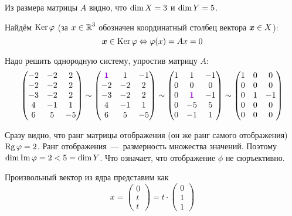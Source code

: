 \documentclass[a4paper,12pt]{article}
\DeclareMathOperator{\Image}{Im}
\begin{document}
  \begin{solution}
    Из размера матрицы $A$ видно, что $\dim X \hm= 3$ и $\dim Y \hm= 5$.
    
    Найдём $\operatorname{Ker}\varphi$ (за $x \hm\in \RR^3$ обозначен координатный столбец вектора $\boldsymbol x \in X$):
    \[
      \boldsymbol x \in \operatorname{Ker}\varphi \Leftrightarrow \varphi(x) = Ax = 0
    \]
    
    Надо решить однородную систему, упростив матрицу $A$:
    \begin{equation*}\label{p-23-29-gauss}
      \begin{pmatrix}
        -2 & -2 & 2\\
        -2 & -2 & 2\\
        -3 & -2 & 2\\
        4 & -1 & 1\\
        6 & 5 & -5
      \end{pmatrix}
      \sim \begin{pmatrix}
        \textcolor{violet}{\bds 1} & 1 & -1\\
        -2 & -2 & 2\\
        -3 & -2 & 2\\
        4 & -1 & 1\\
        6 & 5 & -5
      \end{pmatrix}
      \sim \begin{pmatrix}
        1 & 1 & -1\\
        0 & 0 & 0\\
        0 & \textcolor{violet}{\bds 1} & -1\\
        0 & -5 & 5\\
        0 & -1 & 1
      \end{pmatrix}
      \sim \begin{pmatrix}
        1 & 0 & 0\\
        0 & 0 & 0\\
        0 & 1 & -1\\
        0 & 0 & 0\\
        0 & 0 & 0
      \end{pmatrix}
    \end{equation*}
    
    Сразу видно, что ранг матрицы отображения (он же ранг самого отображения) $\Rg\phi \hm= 2$.
    Ранг отображения~---~размерность множества значений.
    Поэтому $\dim\Image\phi \hm= 2 \hm< 5 \hm= \dim Y$.
    Что означает, что отображение $\phi$ не сюръективно.
    
    Произвольный вектор из ядра представим как
    \[
      x = \begin{pmatrix}
        0 \\ t \\ t
      \end{pmatrix} = t \cdot \begin{pmatrix}
        0 \\ 1 \\ 1
      \end{pmatrix}
    \]
    

\end{solution}
\end{document}
